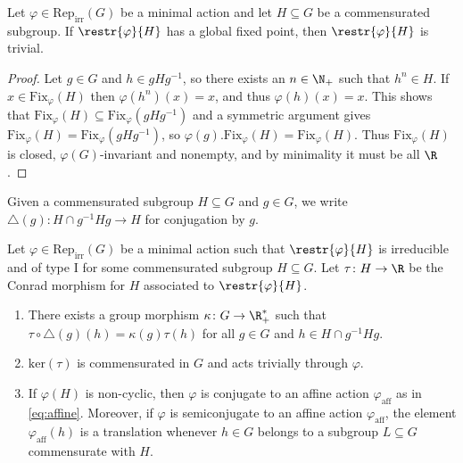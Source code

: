 \documentclass[reqno]{amsart}
\begin{document}
\begin{prop} \label{prop:fixComm}
Let $\varphi \in \mathrm{Rep}_\mathrm{irr}(G)$ be a minimal action and let $H \subseteq G$ be a commensurated subgroup. If $\restr{\varphi}{H}$ has a global fixed point, then $\restr{\varphi}{H}$ is trivial.
\end{prop}
\begin{proof}
Let $g \in G$ and $h \in gHg^{-1}$, so there exists an $n \in \N_+$ such that $h^n \in H$. If $x \in \mathrm{Fix}_\varphi(H)$ then $\varphi(h^n)(x) = x$, and thus $\varphi(h)(x) = x$. This shows that $\mathrm{Fix}_\varphi(H) \subseteq \mathrm{Fix}_\varphi(gHg^{-1})$ and a symmetric argument gives $\mathrm{Fix}_\varphi(H) = \mathrm{Fix}_\varphi(gHg^{-1})$, so $\varphi(g).\mathrm{Fix}_\varphi(H) = \mathrm{Fix}_\varphi(H)$. Thus $\mathrm{Fix}_\varphi(H)$ is closed, $\varphi(G)$-invariant and nonempty, and by minimality it must be all $\R$.
\end{proof}

Given a commensurated subgroup $H \subseteq G$ and $g \in G$, we write $\triangle(g) \colon H \cap g^{-1}H g \to H$ for conjugation by $g$.

\begin{lema} \label{lema:struct1}
Let $\varphi \in \mathrm{Rep}_\mathrm{irr}(G)$ be a minimal action such that $\restr{\varphi}{H}$ is irreducible and of type I for some commensurated subgroup $H \subseteq G$. Let $\tau \colon H \to \R$ be the Conrad morphism for $H$ associated to $\restr{\varphi}{H}$.
\begin{enumerate}
        \item \label{it:s1} There exists a group morphism $\kappa \colon G \to \R^\ast_+$ such that $\tau \circ \triangle(g)(h) = \kappa(g) \tau(h)$ for all $g \in G$ and $h \in H \cap g^{-1}H g$.
        \item \label{it:s2} $\mathrm{ker}(\tau)$ is commensurated in $G$ and acts trivially through $\varphi$.
        \item \label{it:s3} If $\varphi(H)$ is non-cyclic, then $\varphi$ is conjugate to an affine action $\varphi_\mathrm{aff}$ as in \eqref{eq:affine}. Moreover, if $\varphi$ is semiconjugate to an affine action $\varphi_\mathrm{aff}$, the element $\varphi_\mathrm{aff}(h)$ is a translation whenever $h \in G$ belongs to a subgroup $L \subseteq G$ commensurate with $H$.
\end{enumerate}
\end{lema}
\end{document}

